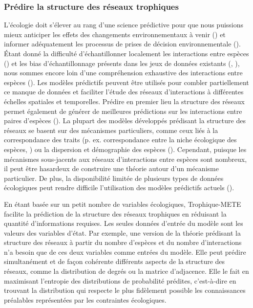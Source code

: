 \subsubsection{Prédire la structure des réseaux trophiques} 

L'écologie doit s'élever au rang d'une science prédictive pour que nous
puissions mieux anticiper les effets des changements environnementaux à venir
(\cite{Evans2012Predictive}) et informer adéquatement les processus de prises de
décision environnementale (\cite{Clark2001Ecological}). Étant donné la
difficulté d'échantillonner localement les interactions entre espèces
(\cite{Jordano2016Sampling}) et les bias d'échantillonnage présents dans les
jeux de données existants (\cite{Aguiar2019Revealing}, \cite{Poisot2021Global}),
nous sommes encore loin d'une compréhension exhaustive des interactions entre
espèces (\cite{Hortal2015Seven}). Les modèles prédictifs peuvent être utilisés
pour combler partiellement ce manque de données et faciliter l'étude des réseaux
d'interactions à différentes échelles spatiales et temporelles. Prédire en
premier lieu la structure des réseaux permet également de générer de meilleures
prédictions sur les interactions entre paires d'espèces (\cite{Strydom2021Roadmapa}). La
plupart des modèles développés prédisant la structure des réseaux se basent sur
des mécanismes particuliers, comme ceux liés à la correspondance des traits (p.
ex. correspondance entre la niche écologique des espèces,
\cite{Williams2000Simple}) ou la dispersion et démographie des espèces
(\cite{Canard2012Emergence}). Cependant, puisque les mécanismes sous-jacents aux
réseaux d'interactions entre espèces sont nombreux, il peut être hasardeux de
construire une théorie autour d'un mécanisme particulier. De plus, la
disponibilité limitée de plusieurs types de données écologiques peut rendre
difficile l'utilisation des modèles prédictifs actuels (\cite{Strydom2021Roadmapa}). 

En étant basée sur un petit nombre de variables écologiques, Trophique-METE
facilite la prédiction de la structure des réseaux trophiques en réduisant la
quantité d'informations requises. Les seules données d'entrée du modèle sont les
valeurs des variables d'état. Par exemple, une version de la théorie prédisant
la structure des réseaux à partir du nombre d'espèces et du nombre
d'interactions n'a besoin que de ces deux variables comme entrées du modèle.
Elle peut prédire simultanément et de façon cohérente différents aspects de la
structure des réseaux, comme la distribution de degrés ou la matrice
d'adjacence. Elle le fait en maximisant l'entropie des distributions de
probabilité prédites, c'est-à-dire en trouvant la distribution qui respecte le
plus fidèlement possible les connaissances préalables représentées par les
contraintes écologiques. 

